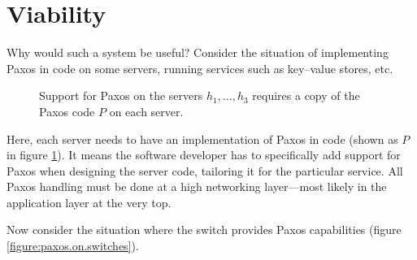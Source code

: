 \section{Viability}

Why would such a system be useful? Consider the situation of implementing
Paxos in code on some servers, running services such as key--value stores,
etc.

\begin{figure}[H]
  \centering
  \caption{Support for Paxos on the servers $h_1, \dots, h_3$ requires a
    copy of the Paxos code $P$ on each server.}
  \label{figure:paxos.on.servers}
\end{figure}

Here, each server needs to have an implementation of Paxos in code (shown as $P$
in figure \ref{figure:paxos.on.servers}).
It means the software developer has to specifically add support
for Paxos when designing the server code, tailoring it for the
particular service.  All Paxos handling must be done
at a high networking layer---most likely in the application layer at the
very top.

Now consider the situation where the switch provides Paxos capabilities
(figure \ref{figure:paxos.on.switches}).

